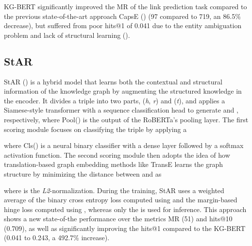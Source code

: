 \documentclass[11pt]{article}
\begin{document}
KG-BERT significantly improved the MR of the link prediction task compared to the previous state-of-the-art approach CapsE (\citealp{vu2019capsule}) (97 compared to 719, an 86.5\% decrease), but suffered from poor hits@1 of 0.041 due to the entity ambiguation problem and lack of structural learning (\citealp{wang2021structure, cucerzan2007large}).

\subsection{StAR}
StAR (\citealp{wang2021structure}) is a hybrid model that learns both the contextual and structural information of the knowledge graph by augmenting the structured knowledge in the encoder. It divides a triple into two parts, (\emph{h}, \emph{r}) and (\emph{t}), and applies a Siamese-style transformer with a sequence classification head to generate  and , respectively, where Pool() is the output of the RoBERTa's pooling layer. The first scoring module focuses on classifying the triple by applying a



where Cls() is a neural binary classifier with a dense layer followed by a softmax activation function. The second scoring module then adopts the idea of how translation-based graph embedding methods like TransE learns the graph structure by minimizing the distance between  and  as



where  is the \emph{L2}-normalization. During the training, StAR uses a weighted average of the binary cross entropy loss computed using  and the margin-based hinge loss computed using , whereas only the  is used for inference. This approach shows a new state-of-the performance over the metrics MR (51) and hits@10 (0.709), as well as significantly improving the hits@1 compared to the KG-BERT (0.041 to 0.243, a 492.7\% increase).
\end{document}
